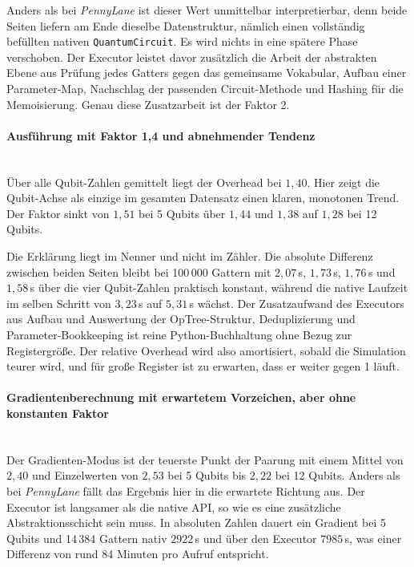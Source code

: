 Anders als bei \textit{PennyLane} ist dieser Wert unmittelbar interpretierbar,
denn beide Seiten liefern am Ende dieselbe Datenstruktur, nämlich einen
vollständig befüllten nativen \texttt{QuantumCircuit}. Es wird nichts in eine
spätere Phase verschoben. Der Executor leistet davor zusätzlich die Arbeit der
abstrakten Ebene aus Prüfung jedes Gatters gegen das gemeinsame Vokabular,
Aufbau einer Parameter-Map, Nachschlag der passenden Circuit-Methode und Hashing
für die Memoisierung. Genau diese Zusatzarbeit ist der Faktor 2.

\paragraph*{Ausführung mit Faktor 1,4 und abnehmender Tendenz}\mbox{}\\
Über alle Qubit-Zahlen gemittelt liegt der Overhead bei $1{,}40$. Hier zeigt die
Qubit-Achse als einzige im gesamten Datensatz einen klaren, monotonen Trend. Der
Faktor sinkt von $1{,}51$ bei 5 Qubits über $1{,}44$ und $1{,}38$ auf $1{,}28$
bei 12 Qubits.

Die Erklärung liegt im Nenner und nicht im Zähler. Die absolute Differenz
zwischen beiden Seiten bleibt bei 100\,000 Gattern mit $2{,}07$\,s, $1{,}73$\,s,
$1{,}76$\,s und $1{,}58$\,s über die vier Qubit-Zahlen praktisch konstant,
während die native Laufzeit im selben Schritt von $3{,}23$\,s auf $5{,}31$\,s
wächst. Der Zusatzaufwand des Executors aus Aufbau und Auswertung der
OpTree-Struktur, Deduplizierung und Parameter-Bookkeeping ist reine
Python-Buchhaltung ohne Bezug zur Registergröße. Der relative Overhead wird also
amortisiert, sobald die Simulation teurer wird, und für große Register ist zu
erwarten, dass er weiter gegen 1 läuft.

\paragraph*{Gradientenberechnung mit erwartetem Vorzeichen, aber ohne konstanten
Faktor}\mbox{}\\
Der Gradienten-Modus ist der teuerste Punkt der Paarung mit einem Mittel von
$2{,}40$ und Einzelwerten von $2{,}53$ bei 5 Qubits bis $2{,}22$ bei 12 Qubits.
Anders als bei \textit{PennyLane} fällt das Ergebnis hier in die erwartete
Richtung aus. Der Executor ist langsamer als die native API, so wie es eine
zusätzliche Abstraktionsschicht sein muss. In absoluten Zahlen dauert ein
Gradient bei 5 Qubits und 14\,384 Gattern nativ $2922$\,s und über den Executor
$7985$\,s, was einer Differenz von rund 84 Minuten pro Aufruf entspricht.

